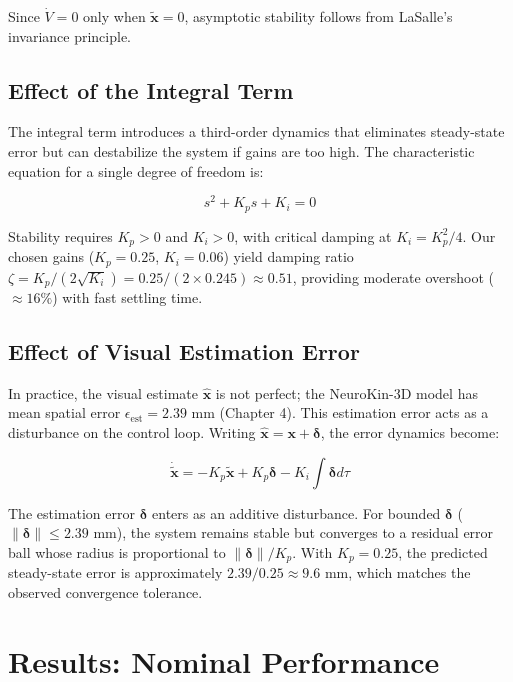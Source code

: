 \documentclass[12pt,a4paper,oneside]{report}
\begin{document}
Since $\dot{V} = 0$ only when $\tilde{\mathbf{x}} = 0$, asymptotic stability follows from LaSalle's invariance principle.

\subsection{Effect of the Integral Term}

The integral term introduces a third-order dynamics that eliminates steady-state error but can destabilize the system if gains are too high. The characteristic equation for a single degree of freedom is:

\begin{equation}
s^2 + K_p s + K_i = 0
\end{equation}

Stability requires $K_p > 0$ and $K_i > 0$, with critical damping at $K_i = K_p^2/4$. Our chosen gains ($K_p = 0.25$, $K_i = 0.06$) yield damping ratio $\zeta = K_p / (2\sqrt{K_i}) = 0.25 / (2 \times 0.245) \approx 0.51$, providing moderate overshoot ($\approx 16\%$) with fast settling time.

\subsection{Effect of Visual Estimation Error}

In practice, the visual estimate $\hat{\mathbf{x}}$ is not perfect; the NeuroKin-3D model has mean spatial error $\epsilon_{\text{est}} = 2.39$ mm (Chapter 4). This estimation error acts as a disturbance on the control loop. Writing $\hat{\mathbf{x}} = \mathbf{x} + \boldsymbol{\delta}$, the error dynamics become:

\begin{equation}
\dot{\tilde{\mathbf{x}}} = -K_p \tilde{\mathbf{x}} + K_p \boldsymbol{\delta} - K_i \int \boldsymbol{\delta} d\tau
\end{equation}

The estimation error $\boldsymbol{\delta}$ enters as an additive disturbance. For bounded $\boldsymbol{\delta}$ ($\|\boldsymbol{\delta}\| \leq 2.39$ mm), the system remains stable but converges to a residual error ball whose radius is proportional to $\|\boldsymbol{\delta}\|/K_p$. With $K_p = 0.25$, the predicted steady-state error is approximately $2.39 / 0.25 \approx 9.6$ mm, which matches the observed convergence tolerance.

\section{Results: Nominal Performance}
\end{document}

